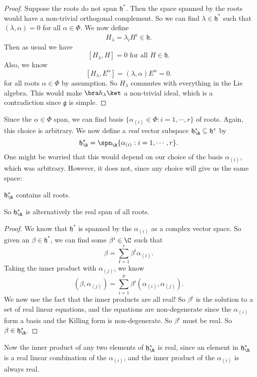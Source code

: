 \documentclass[a4paper]{article}
\begin{document}
\begin{proof}
  Suppose the roots do not span $\mathfrak{h}^*$. Then the space spanned by the roots would have a non-trivial orthogonal complement. So we can find $\lambda \in \mathfrak{h}^*$ such that $(\lambda, \alpha) = 0$ for all $\alpha \in \Phi$.
  We now define
  \[
    H_{\lambda} = \lambda_i H^i \in \mathfrak{h}.
  \]
  Then as usual we have
  \[
    [H_\lambda, H] = 0\text{ for all }H \in \mathfrak{h}.
  \]
  Also, we know
  \[
    [H_\lambda, E^\alpha] = (\lambda, \alpha) E^\alpha = 0.
  \]
  for all roots $\alpha \in \Phi$ by assumption. So $H_\lambda$ commutes with everything in the Lie algebra. This would make $\bra h_\lambda\ket$ a non-trivial ideal, which is a contradiction since $\mathfrak{g}$ is simple.
\end{proof}
Since the $\alpha \in \Phi$ span, we can find basis $\{\alpha_{(i)} \in \Phi: i = 1, \cdots, r\}$ of roots. Again, this choice is arbitrary. We now define a \emph{real} vector subspace $\mathfrak{h}_\R^* \subseteq \mathfrak{h}^*$ by
\[
  \mathfrak{h}_\R^* = \spn_\R\{\alpha_{(i)}: i = 1, \cdots, r\}.
\]
One might be worried that this would depend on our choice of the basis $\alpha_{(i)}$, which was arbitrary. However, it does not, since any choice will give us the same space:
\begin{prop}
  $\mathfrak{h}_\R^*$ contains all roots.
\end{prop}
So $\mathfrak{h}_\R^*$ is alternatively the real span of all roots.

\begin{proof}
  We know that $\mathfrak{h}^*$ is spanned by the $\alpha_{(i)}$ as a complex vector space. So given an $\beta \in \mathfrak{h}^*$, we can find some $\beta^i \in \C$ such that
  \[
    \beta = \sum_{I = 1}^r \beta^i \alpha_{(i)}.
  \]
  Taking the inner product with $\alpha_{(j)}$, we know
  \[
    (\beta, \alpha_{(j)}) = \sum_{i = 1}^p \beta^i(\alpha_{(i)}, \alpha_{(j)}).
  \]
  We now use the fact that the inner products are all real! So $\beta^i$ is the solution to a set of real linear equations, and the equations are non-degenerate since the $\alpha_{(i)}$ form a basis and the Killing form is non-degenerate. So $\beta^i$ must be real. So $\beta \in \mathfrak{h}^*_\R$.
\end{proof}

Now the inner product of any two elements of $\mathfrak{h}_\R^*$ is real, since an element in $\mathfrak{h}_\R^*$ is a real linear combination of the $\alpha_{(i)}$, and the inner product of the $\alpha_{(i)}$ is always real.
\end{document}
